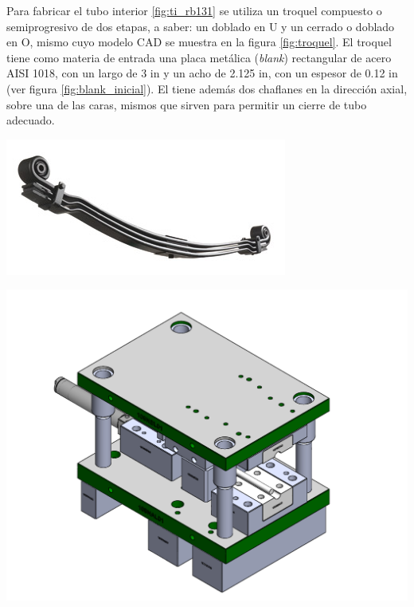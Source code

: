Para fabricar el tubo interior \ref{fig:ti_rb131} se utiliza un troquel compuesto o semiprogresivo 
de dos etapas, a saber: un doblado en U y un cerrado o doblado en O, mismo cuyo modelo CAD se muestra 
en la figura \ref{fig:troquel}. El troquel tiene como materia de entrada una placa metálica 
(\textit{blank}) rectangular de acero AISI 1018, con un largo de 3 in y un acho de 2.125 in, 
con un espesor de 0.12 in (ver figura \ref{fig:blank_inicial}). El  tiene además 
dos chaflanes en la dirección axial, sobre una de las caras, mismos que sirven para permitir un 
cierre de tubo adecuado.


\begin{center}
\includegraphics[scale=0.65]{src/ch3/muelle_parabolica.jpg}
\label{fig:muelle_parabolica}
\end{center}


\begin{center}
\includegraphics[scale=0.4]{src/ch3/troquel.pdf}
\label{fig:troquel}
\end{center}


